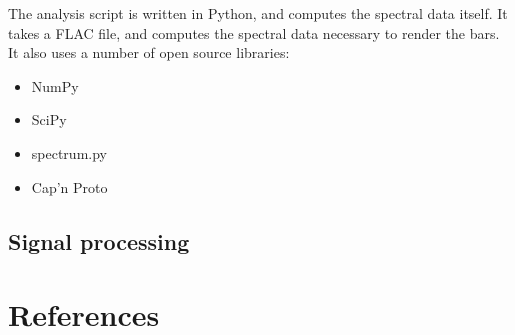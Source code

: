 \documentclass[11pt]{article}
\begin{document}
The analysis script is written in Python, and computes the spectral data itself. It takes a FLAC file, and
computes the spectral data necessary to render the bars. It also uses a number of open source libraries:
\begin{itemize}
    \item NumPy
    \item SciPy
    \item spectrum.py
    \item Cap'n Proto
\end{itemize}

\subsection{Signal processing}

\section{References}
\printbibliography[heading=none]
\end{document}
